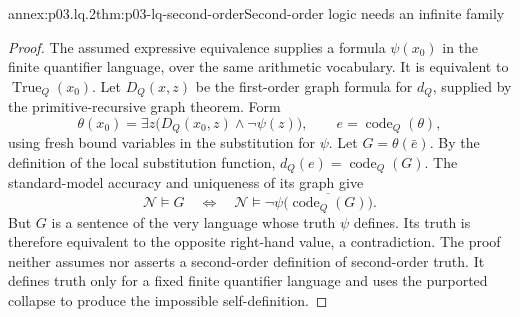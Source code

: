 \begin{annexitem}{annex:p03.lq.2}{thm:p03-lq-second-order}{Second-order logic needs an infinite family}
\begin{proof}
The assumed expressive equivalence supplies a formula \(\psi(x_0)\)
in the finite quantifier language, over the same arithmetic vocabulary.
It is equivalent to \(\operatorname{True}_Q(x_0)\).
Let \(D_Q(x,z)\) be the first-order graph formula for \(d_Q\),
supplied by the primitive-recursive graph theorem. Form
\[
 \theta(x_0)=\exists z\bigl(D_Q(x_0,z)\land\neg\psi(z)\bigr),
 \qquad e=\operatorname{code}_Q(\theta),
\]
using fresh bound variables in the substitution for \(\psi\).
Let \(G=\theta(\bar e)\). By the definition of the local
substitution function, \(d_Q(e)=\operatorname{code}_Q(G)\).
The standard-model accuracy and uniqueness of its graph give
\[
 \mathcal N\models G
 \quad\Longleftrightarrow\quad
 \mathcal N\models\neg\psi\bigl(\overline{\operatorname{code}_Q(G)}\bigr).
\]
But \(G\) is a sentence of the very language whose truth \(\psi\)
defines. Its truth is therefore equivalent to the opposite right-hand
value, a contradiction. The proof neither assumes nor asserts a
second-order definition of second-order truth. It defines truth only
for a fixed finite quantifier language and uses the purported collapse
to produce the impossible self-definition.
\end{proof}
\end{annexitem}

